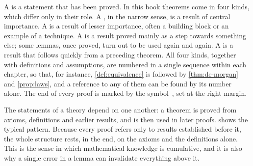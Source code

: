 A  is a statement that has been proved. In this book theorems come in four kinds, which differ only in their role. A , in the narrow sense, is a result of central importance. A  is a result of lesser importance, often a building block or an example of a technique. A  is a result proved mainly as a step towards something else; some lemmas, once proved, turn out to be used again and again. A  is a result that follows quickly from a preceding theorem. All four kinds, together with definitions and assumptions, are numbered in a single sequence within each chapter, so that, for instance, \cref{def:equivalence} is followed by \cref{thm:de-morgan} and \cref{prop:laws}, and a reference to any of them can be found by its number alone. The end of every proof is marked by the symbol~\qedsymbol, set at the right margin.

The statements of a theory depend on one another: a theorem is proved from axioms, definitions and earlier results, and is then used in later proofs.  shows the typical pattern. Because every proof refers only to results established before it, the whole structure rests, in the end, on the axioms and the definitions alone. This is the sense in which mathematical knowledge is cumulative, and it is also why a single error in a lemma can invalidate everything above it.

\begin{figure}
\end{figure}

